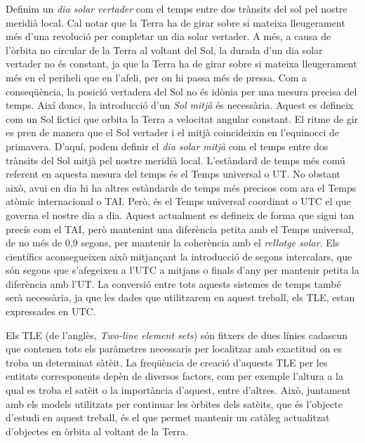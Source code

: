 \documentclass{article}
\begin{document}
Definim un \emph{dia solar vertader} com el temps entre dos trànsits del sol pel nostre meridià local. Cal notar que la Terra ha de girar sobre si mateixa lleugerament més d'una revolució per completar un dia solar vertader. A més, a causa de l'òrbita no circular de la Terra al voltant del Sol, la durada d'un dia solar vertader no és constant, ja que la Terra ha de girar sobre si mateixa lleugerament més en el periheli que en l'afeli, per on hi passa més de pressa. Com a conseqüència, la posició vertadera del Sol no és idònia per una mesura precisa del temps. Així doncs, la introducció d'un \emph{Sol mitjà} és necessària. Aquest es defineix com un Sol fictici que orbita la Terra a velocitat angular constant. El ritme de gir es pren de manera que el Sol vertader i el mitjà coincideixin en l'equinocci de primavera. D'aquí, podem definir el \emph{dia solar mitjà} com el temps entre dos trànsits del Sol mitjà pel nostre meridià local. L'estàndard de temps més comú referent en aquesta mesura del temps és el Temps universal o UT. No obstant això, avui en dia hi ha altres estàndards de temps més precisos com ara el Temps atòmic internacional o TAI. Però, és el Temps universal coordinat o UTC el que governa el nostre dia a dia. Aquest actualment es defineix de forma que sigui tan precís com el TAI, però mantenint una diferència petita amb el Temps universal, de no més de 0,9 segons, per mantenir la coherència amb el \emph{rellotge solar}. Els científics aconsegueixen això mitjançant la introducció de segons intercalars, que són segons que s'afegeixen a l'UTC a mitjans o finals d'any per mantenir petita la diferència amb l'UT. La conversió entre tots aquests sistemes de temps també serà necessària, ja que les dades que utilitzarem en aquest treball, els TLE, estan expressades en UTC.

Els TLE (de l'anglès, \emph{Two-line element sets}) són fitxers de dues línies cadascun que contenen tots els paràmetres necessaris per localitzar amb exactitud on es troba un determinat sàtè\lgem it. La freqüència de creació d'aquests TLE per les entitats corresponents depèn de diversos factors, com per exemple l'altura a la qual es troba el satè\lgem it o la importància d'aquest, entre d'altres. Això, juntament amb els models utilitzats per continuar les òrbites dels satè\lgem its, que és l'objecte d'estudi en aquest treball, és el que permet mantenir un catàleg actualitzat d'objectes en òrbita al voltant de la Terra.
\end{document}
